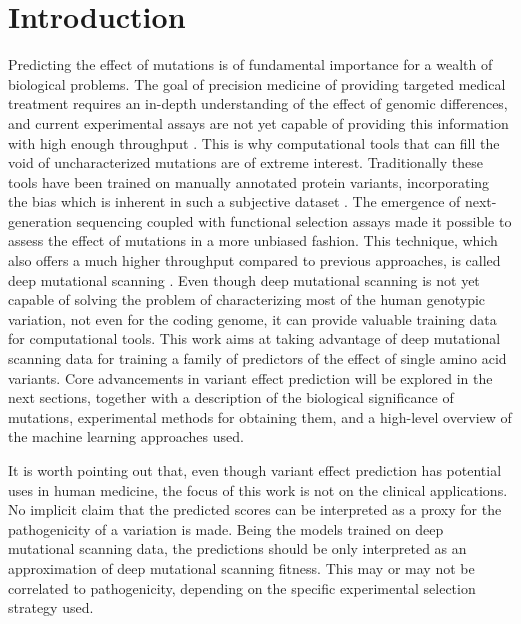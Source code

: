 \cleardoublepage%
\chapter{Introduction}
Predicting the effect of mutations is of fundamental importance for a wealth of biological problems.
The goal of precision medicine of providing targeted medical treatment \parencite{Goetz2018} requires an in-depth understanding of the effect of genomic differences, and current experimental assays are not yet capable of providing this information with high enough throughput \parencite{Reeb2020}.
This is why computational tools that can fill the void of uncharacterized mutations are of extreme interest.
Traditionally these tools have been trained on manually annotated protein variants, incorporating the bias which is inherent in such a subjective dataset \parencite{Gray2018}.
The emergence of next-generation sequencing coupled with functional selection assays made it possible to assess the effect of mutations in a more unbiased fashion.
This technique, which also offers a much higher throughput compared to previous approaches, is called deep mutational scanning \parencite{Fowler2014}.
Even though deep mutational scanning is not yet capable of solving the problem of characterizing most of the human genotypic variation, not even for the coding genome, it can provide valuable training data for computational tools.
This work aims at taking advantage of deep mutational scanning data for training a family of predictors of the effect of single amino acid variants.
Core advancements in variant effect prediction will be explored in the next sections, together with a description of the biological significance of mutations, experimental methods for obtaining them, and a high-level overview of the machine learning approaches used.

It is worth pointing out that, even though variant effect prediction has potential uses in human medicine, the focus of this work is not on the clinical applications.
No implicit claim that the predicted scores can be interpreted as a proxy for the pathogenicity of a variation is made.
Being the models trained on deep mutational scanning data, the predictions should be only interpreted as an approximation of deep mutational scanning fitness.
This may or may not be correlated to pathogenicity, depending on the specific experimental selection strategy used.


